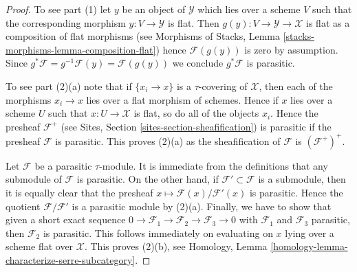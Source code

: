 \begin{proof}
To see part (1) let $y$ be an object of $\mathcal{Y}$ which lies
over a scheme $V$ such that the corresponding morphism $y : V \to \mathcal{Y}$
is flat. Then $g(y) : V \to \mathcal{Y} \to \mathcal{X}$ is flat
as a composition of flat morphisms (see
Morphisms of Stacks, Lemma \ref{stacks-morphisms-lemma-composition-flat})
hence $\mathcal{F}(g(y))$ is zero by assumption. Since
$g^*\mathcal{F} = g^{-1}\mathcal{F}(y) = \mathcal{F}(g(y))$ we conclude
$g^*\mathcal{F}$ is parasitic.

\medskip\noindent
To see part (2)(a) note that if $\{x_i \to x\}$ is a $\tau$-covering
of $\mathcal{X}$, then each of the morphisms $x_i \to x$ lies
over a flat morphism of schemes. Hence if $x$ lies over a scheme
$U$ such that $x : U \to \mathcal{X}$ is flat, so do all of the
objects $x_i$. Hence the presheaf $\mathcal{F}^+$ (see
Sites, Section \ref{sites-section-sheafification})
is parasitic if the presheaf $\mathcal{F}$ is
parasitic. This proves (2)(a) as the sheafification of $\mathcal{F}$
is $(\mathcal{F}^+)^+$.

\medskip\noindent
Let $\mathcal{F}$ be a parasitic $\tau$-module. It is immediate from the
definitions that any submodule of $\mathcal{F}$ is parasitic. On the other
hand, if $\mathcal{F}' \subset \mathcal{F}$ is a submodule, then it is
equally clear that the presheaf
$x \mapsto \mathcal{F}(x)/\mathcal{F}'(x)$
is parasitic. Hence the quotient $\mathcal{F}/\mathcal{F}'$ is a parasitic
module by (2)(a). Finally, we have to show that given a short exact sequence
$0 \to \mathcal{F}_1 \to \mathcal{F}_2 \to \mathcal{F}_3 \to 0$
with $\mathcal{F}_1$ and $\mathcal{F}_3$ parasitic, then $\mathcal{F}_2$
is parasitic. This follows immediately on evaluating on $x$ lying
over a scheme flat over $\mathcal{X}$. This proves (2)(b), see
Homology, Lemma \ref{homology-lemma-characterize-serre-subcategory}.


\end{proof}
